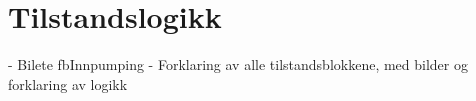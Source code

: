 \section{Tilstandslogikk}
\thispagestyle{fancy}

- Bilete fbInnpumping
- Forklaring av alle tilstandsblokkene, med bilder og forklaring av logikk

